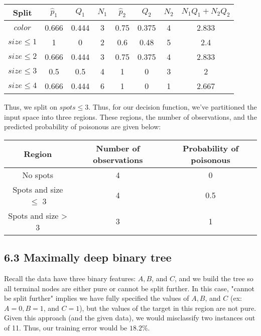 \documentclass[paper=a4, fontsize=11pt]{scrartcl} %
\numberwithin{equation}{section} %
\numberwithin{figure}{section} %
\numberwithin{table}{section} %
\begin{document}
\begin{center}
\begin{tabular}{| c | c | c | c | c | c | c | c |}
\hline
	\textbf{Split} & $\hat{p}_1$ & $Q_1$ & $N_1$ & $\hat{p}_2$ & $Q_2$ & $N_2$ & $N_1Q_1 + N_2Q_2$ \\
\hline
	$color$ & 0.666 & 0.444 & 3 & 0.75 & 0.375 & 4 & 2.833 \\ \hline
	$size \leq 1$ & 1 & 0 & 2 & 0.6 & 0.48 & 5 & 2.4 \\ \hline
	$size \leq 2$  & 0.666 & 0.444 & 3 & 0.75 & 0.375 & 4 & 2.833 \\ \hline
	$size \leq 3$ & 0.5 & 0.5 & 4 & 1 & 0 & 3 & 2 \\ \hline
	$size \leq 4$ &  0.666 & 0.444 & 6 & 1 & 0 & 1 & 2.667 \\ \hline
\end{tabular}
\end{center}
Thus, we split on $spots \leq 3$. Thus, for our decision function, we've partitioned the input space into three regions. These regions, the number of observations, and the predicted probability of poisonous are given below:
\begin{center}
\begin{tabular} {| c | c | c |}
\hline
	Region & Number of observations & Probability of poisonous \\
\hline
	No spots & 4 & 0 \\
\hline
	Spots and size $\leq$ 3 & 4  & 0.5\\
\hline
	Spots and size > 3 & 3 & 1\\
\hline
\end{tabular}
\end{center}

\subsection*{6.3 Maximally deep binary tree}

Recall the data have three binary features: $A, B$, and $C$, and we build the tree so all terminal nodes are either pure or cannot be split further. In this case, "cannot be split further" implies we have fully specified the values of $A, B$, and $C$ (ex: $A = 0, B = 1$, and $C = 1$), but the values of the target in this region are not pure. \\

Given this approach (and the given data), we would misclassify two instances out of 11. Thus, our training error would be $18.2\%$.
\end{document}
